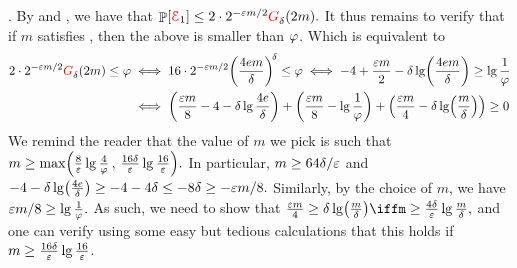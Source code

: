 \begin{proofof} {\textsc{.}}
    By  and , we have that
    \begin{math}
        \Prob{\Event_1} \leq%
        2 \cdot 2^{-\eps m /2} \fGrowX{2m}.
    \end{math}
    It thus remains to verify that if $m$ satisfies ,
    then the above is smaller than $\varphi$.
    Which is equivalent to
    \begin{align*}
      2 \cdot 2^{-\eps m/2} \fGrowX{2m} \leq \BadProb
      &  \iff
        16 \cdot 2^{-\eps m/2} \pth{\frac{4 e m}{\Dim}}^{\!\Dim}
        \leq \BadProb
      \iff
        -4 + \frac{\eps m }{ 2} - \Dim \lg \pth{\frac{4 e m}{\Dim}}
        \geq \lg \frac{1}{\BadProb}%
      \\%
      &%
        \iff
        \pth{ \frac{ \eps m}{8} -4 - \Dim \lg \frac{4 e}{\Dim}}
        + \pth{ \frac{\eps m}{8} - \lg \frac{1}{\BadProb}}
        + \pth{\frac{\eps m }{ 4} - \Dim \lg \pth{\frac{ m}{\Dim}}}
        \geq 0%
    \end{align*}
    We remind the reader that the value of $m$ we pick is such that 
    \begin{math}
        m \geq \max\pth{ \frac{8}{\eps} \lg \frac{4}{\BadProb} \,,\,
           \frac{16\Dim}{\eps}\lg \frac{16}{\eps} }.
    \end{math}
    In particular, $m \geq 64 \delta / {\varepsilon}$
    and
    \begin{math}
        -4 - \Dim \lg \pth{\frac{4 e }{\Dim}} \geq -4 - 4 \Dim \leq -8
        \Dim \geq -\eps m /8.
    \end{math} 
    Similarly, by the choice of $m$, we have
    \begin{math}
        {\varepsilon} m /8 \geq \lg \frac{1}{\varphi}. 
    \end{math}
    As such, we need to show that
    \begin{math}
        \frac{\eps m }{ 4} \geq \Dim \lg \pth{\frac{ m}{\Dim}} \iff%
        m \geq \frac{4\Dim}{\eps} \lg {\frac{ m}{\Dim}},
    \end{math}
    and one can verify using some easy but tedious calculations that
    this holds if $ m \geq \frac{16\delta}{{\varepsilon}}\lg \frac{16}{{\varepsilon}} $.
%    
\end{proofof}







